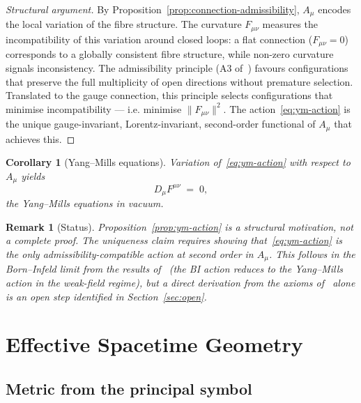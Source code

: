 \documentclass[11pt,a4paper]{article}
\newtheorem{corollary}[theorem]{Corollary}
\newtheorem{remark}[theorem]{Remark}
\begin{document}
      \begin{proof}[Structural argument]
        By Proposition~\ref{prop:connection-admissibility}, $A_\mu$ encodes the local
        variation of the fibre structure.
        The curvature $F_{\mu\nu}$ measures the incompatibility of this variation
        around closed loops: a flat connection ($F_{\mu\nu} = 0$) corresponds to a
        globally consistent fibre structure, while non-zero curvature signals
        inconsistency.
        The admissibility principle (A3 of~\cite{FoundationM}) favours configurations
        that preserve the full multiplicity of open directions without premature
        selection.
        Translated to the gauge connection, this principle selects configurations that
        minimise incompatibility — i.e. minimise $\|F_{\mu\nu}\|^2$.
        The action~\eqref{eq:ym-action} is the unique gauge-invariant, Lorentz-invariant,
        second-order functional of $A_\mu$ that achieves this.
      \end{proof}

      \begin{corollary}[Yang--Mills equations]
        Variation of~\eqref{eq:ym-action} with respect to $A_\mu$ yields
        \begin{equation}
          \label{eq:ym-equations}
          D_\mu F^{\mu\nu} \;=\; 0,
        \end{equation}
        the Yang--Mills equations in vacuum.
      \end{corollary}

      \begin{remark}[Status]
        Proposition~\ref{prop:ym-action} is a structural motivation, not a complete
        proof.
        The uniqueness claim requires showing that~\eqref{eq:ym-action} is the
        \emph{only} admissibility-compatible action at second order in $A_\mu$.
        This follows in the Born--Infeld limit from the results of~\cite{BornInfeld}
        (the BI action reduces to the Yang--Mills action in the weak-field regime),
        but a direct derivation from the axioms of~\cite{FoundationM} alone is
        an open step identified in Section~\ref{sec:open}.
      \end{remark}

  \section{Effective Spacetime Geometry}
    \label{sec:geometry}

    \subsection{Metric from the principal symbol}
\end{document}
